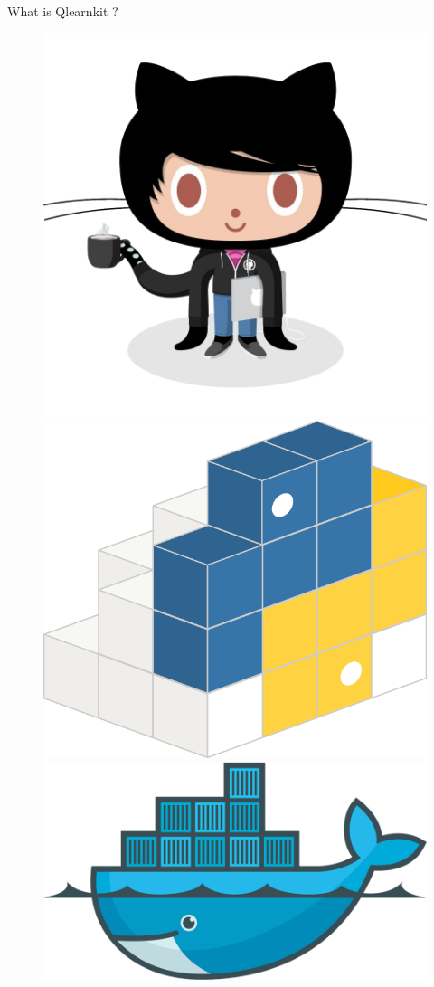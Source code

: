\begin{frame}{What is Qlearnkit ?}
\begin{itemize}
        \begin{figure}
            \centering
            \begin{minipage}[c]{0.3\textwidth}
    			\includegraphics[width=0.55\linewidth]{codercat}
    		\end{minipage}
    		\begin{minipage}[c]{0.3\textwidth}
    			\includegraphics[width=0.4\linewidth]{pypilogo}
    		\end{minipage}
            \begin{minipage}[c]{0.3\textwidth}
			    \includegraphics[width=0.6\linewidth]{docker-logo}
    		\end{minipage}
        \end{figure}
		
    \end{itemize}
\end{frame}


